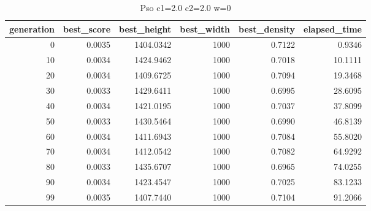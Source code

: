 \begin{table}[htbp]
    \centering
    \caption{Pso c1=2.0 c2=2.0 w=0}
    \label{tab:pso_c1_2_0_c2_2_0_w_0}
    \begin{tabular}{rrrrrr}
    \toprule
    generation & best_score & best_height & best_width & best_density & elapsed_time \\
    \midrule
    0 & 0.0035 & 1404.0342 & 1000 & 0.7122 & 0.9346 \\
    10 & 0.0034 & 1424.9462 & 1000 & 0.7018 & 10.1111 \\
    20 & 0.0034 & 1409.6725 & 1000 & 0.7094 & 19.3468 \\
    30 & 0.0033 & 1429.6411 & 1000 & 0.6995 & 28.6095 \\
    40 & 0.0034 & 1421.0195 & 1000 & 0.7037 & 37.8099 \\
    50 & 0.0033 & 1430.5464 & 1000 & 0.6990 & 46.8139 \\
    60 & 0.0034 & 1411.6943 & 1000 & 0.7084 & 55.8020 \\
    70 & 0.0034 & 1412.0542 & 1000 & 0.7082 & 64.9292 \\
    80 & 0.0033 & 1435.6707 & 1000 & 0.6965 & 74.0255 \\
    90 & 0.0034 & 1423.4547 & 1000 & 0.7025 & 83.1233 \\
    99 & 0.0035 & 1407.7440 & 1000 & 0.7104 & 91.2066 \\
    \bottomrule
    \end{tabular}
\end{table}


